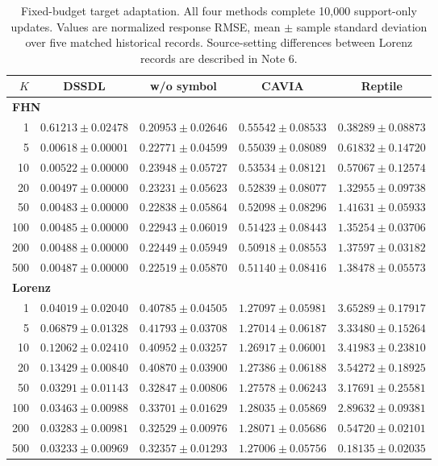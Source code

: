 \begin{table}[!ht]
\centering
\caption{Fixed-budget target adaptation. All four methods complete 10,000 support-only updates. Values are normalized response RMSE, mean $\pm$ sample standard deviation over five matched historical records. Source-setting differences between Lorenz records are described in Note 6.}
\label{tab:matched_budget}
\small
\setlength{\tabcolsep}{4pt}
\renewcommand{\arraystretch}{1.2}
\begin{tabular}{rcccc}
\toprule
$K$ & DSSDL & w/o symbol & CAVIA & Reptile\\
\midrule
\multicolumn{5}{l}{\textbf{FHN}}\\
1 & $0.61213\pm0.02478$ & $0.20953\pm0.02646$ & $0.55542\pm0.08533$ & $0.38289\pm0.08873$ \\
5 & $0.00618\pm0.00001$ & $0.22771\pm0.04599$ & $0.55039\pm0.08089$ & $0.61832\pm0.14720$ \\
10 & $0.00522\pm0.00000$ & $0.23948\pm0.05727$ & $0.53534\pm0.08121$ & $0.57067\pm0.12574$ \\
20 & $0.00497\pm0.00000$ & $0.23231\pm0.05623$ & $0.52839\pm0.08077$ & $1.32955\pm0.09738$ \\
50 & $0.00483\pm0.00000$ & $0.22838\pm0.05864$ & $0.52098\pm0.08296$ & $1.41631\pm0.05933$ \\
100 & $0.00485\pm0.00000$ & $0.22943\pm0.06019$ & $0.51423\pm0.08443$ & $1.35254\pm0.03706$ \\
200 & $0.00488\pm0.00000$ & $0.22449\pm0.05949$ & $0.50918\pm0.08553$ & $1.37597\pm0.03182$ \\
500 & $0.00487\pm0.00000$ & $0.22519\pm0.05870$ & $0.51140\pm0.08416$ & $1.38478\pm0.05573$ \\
\midrule
\multicolumn{5}{l}{\textbf{Lorenz}}\\
1 & $0.04019\pm0.02040$ & $0.40785\pm0.04505$ & $1.27097\pm0.05981$ & $3.65289\pm0.17917$ \\
5 & $0.06879\pm0.01328$ & $0.41793\pm0.03708$ & $1.27014\pm0.06187$ & $3.33480\pm0.15264$ \\
10 & $0.12062\pm0.02410$ & $0.40952\pm0.03257$ & $1.26917\pm0.06001$ & $3.41983\pm0.23810$ \\
20 & $0.13429\pm0.00840$ & $0.40870\pm0.03900$ & $1.27386\pm0.06188$ & $3.54272\pm0.18925$ \\
50 & $0.03291\pm0.01143$ & $0.32847\pm0.00806$ & $1.27578\pm0.06243$ & $3.17691\pm0.25581$ \\
100 & $0.03463\pm0.00988$ & $0.33701\pm0.01629$ & $1.28035\pm0.05869$ & $2.89632\pm0.09381$ \\
200 & $0.03283\pm0.00981$ & $0.32529\pm0.00976$ & $1.28071\pm0.05686$ & $0.54720\pm0.02101$ \\
500 & $0.03233\pm0.00969$ & $0.32357\pm0.01293$ & $1.27006\pm0.05756$ & $0.18135\pm0.02035$ \\
\midrule
\end{tabular}
\end{table}
